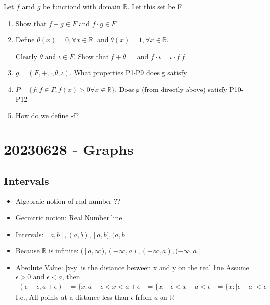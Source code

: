 \documentclass{report}
\begin{document}

    \ex{} {
      Let $f$ amd $g$ be functiond with domain $\mathbb{R}$.  Let
      this set be F
      \begin{enumerate}
        \item Show that $f+g \in F$ and $f \cdot g \in F$
        \item Define $\theta(x) = 0, \forall x \in \mathbb{R}$.  
          and  $\theta(x) = 1, \forall x \in \mathbb{R}$.  


          Clearly $\theta$ and $\iota \in F$.  Show that $f + \theta = $
          and $f \cdot \iota = \iota \cdot f \ f$

        \item $g = (F, +, \cdot, \theta, \iota)$.  What properties P1-P9
          does g satisfy
        \item $P = \{f: f \in F, f(x)>0 \forall  x \in \mathbb{R}\}$.
          Does g (from directly above) satisfy P10-P12
        \item How do we define -f?
      \end{enumerate}
    }

\section*{20230628 - Graphs}
  \subsection{Intervals}%
  \begin{itemize}
    \item Algebraic notion of real number ??
    \item Geomtric notion: Real Number line
    \item Intervals: $[a,b], (a,b), [a,b), (a,b]$
    \item Because $\mathbb{R}$ is infinite: $([a,\infty), (- \infty,a),
      (-\infty, a), (- \infty, a]$
    \item Absolute Value: |x-y| is the distance between x and y on the
      real line
    Assume $\epsilon > 0 \text{ and } \epsilon < a$, then
    \begin{align}
      (a - \epsilon, a + \epsilon) &= \{ x: a - \epsilon < x < a + \epsilon 
      &= \{ x: - \epsilon < x - a < \epsilon 
      &= \{ x: |\epsilon -a | < \epsilon 
    \end{align}
      I.e., All points at a distance less than $\epsilon$ frfom $a$ on
      $\mathbb{R}$
  \end{itemize}
\end{document}
